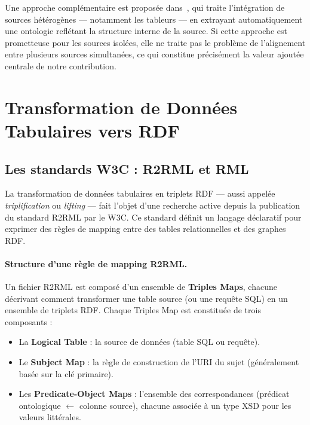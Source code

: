 Une approche complémentaire est proposée dans~\cite{semantic_integration_heterogeneous_2021}, qui traite l'intégration de sources hétérogènes — notamment les tableurs — en extrayant automatiquement une ontologie reflétant la structure interne de la source. Si cette approche est prometteuse pour les sources isolées, elle ne traite pas le problème de l'alignement entre plusieurs sources simultanées, ce qui constitue précisément la valeur ajoutée centrale de notre contribution.

\section{Transformation de Données Tabulaires vers RDF}\label{sec:tabulaire_rdf}
\subsection{Les standards W3C : R2RML et RML}

La transformation de données tabulaires en triplets RDF ---
aussi appelée \textit{triplification} ou \textit{lifting} ---
fait l'objet d'une recherche active depuis la publication du
standard R2RML par le W3C. Ce standard définit un langage déclaratif
pour exprimer des règles de mapping entre des tables relationnelles
et des graphes RDF.

\paragraph{Structure d'une règle de mapping R2RML.}
Un fichier R2RML est composé d'un ensemble de \textbf{Triples Maps},
chacune décrivant comment transformer une table source (ou une
requête SQL) en un ensemble de triplets RDF.
Chaque Triples Map est constituée de trois composants :
\begin{itemize}
    \item La \textbf{Logical Table} : la source de données
          (table SQL ou requête).
    \item Le \textbf{Subject Map} : la règle de construction de
          l'URI du sujet (généralement basée sur la clé primaire).
    \item Les \textbf{Predicate-Object Maps} : l'ensemble des
          correspondances (prédicat ontologique $\leftarrow$
          colonne source), chacune associée à un type XSD
          pour les valeurs littérales.
\end{itemize}

